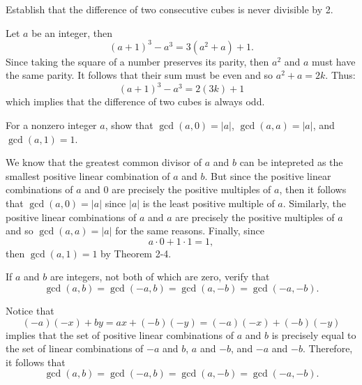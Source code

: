 \begin{exercise}
    Establish that the difference of two consecutive cubes is never divisible by 2. \\
\end{exercise}

\begin{solution}
    Let $a$ be an integer, then
    $$(a+1)^3 - a^3 = 3(a^2 + a) + 1.$$
    Since taking the square of a number preserves its parity, then $a^2$ and $a$ must have the same parity. It follows that their sum must be even and so $a^2 + a = 2k$. Thus:
    $$(a+1)^3 - a^3 = 2(3k) + 1$$
    which implies that the difference of two cubes is always odd. \\
\end{solution}

\begin{exercise}
    For a nonzero integer $a$, show that $\gcd(a,0) = |a|$, $\gcd(a,a) = |a|$, and $\gcd(a,1) = 1$. \\
\end{exercise}

\begin{solution}
    We know that the greatest common divisor of $a$ and $b$ can be intepreted as the smallest positive linear combination of $a$ and $b$. But since the positive linear combinations of $a$ and $0$ are precisely the positive multiples of $a$, then it follows that $\gcd(a, 0) = |a|$ since $|a|$ is the least positive multiple of $a$. Similarly, the positive linear combinations of $a$ and $a$ are precisely the positive multiples of $a$ and so $\gcd(a,a) = |a|$ for the same reasons. Finally, since 
    $$a\cdot 0 + 1\cdot 1 = 1,$$
    then $\gcd(a,1) = 1$ by Theorem 2-4. \\
\end{solution}

\begin{exercise}
    If $a$ and $b$ are integers, not both of which are zero, verify that
    $$\gcd(a,b) = \gcd(-a, b) = \gcd(a, -b) = \gcd(-a, -b).$$
\end{exercise}

\begin{solution}
    Notice that
    $$(-a)(-x) + by = ax + (-b)(-y) = (-a)(-x) + (-b)(-y)$$
    implies that the set of positive linear combinations of $a$ and $b$ is precisely equal to the set of linear combinations of $-a$ and $b$, $a$ and $-b$, and $-a$ and $-b$. Therefore, it follows that
    $$\gcd(a,b) = \gcd(-a, b) = \gcd(a, -b) = \gcd(-a, -b).$$
\end{solution}

